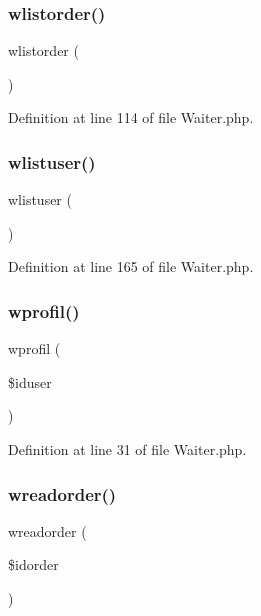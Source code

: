 \subsubsection{\texorpdfstring{wlistorder()}{wlistorder()}}
{\footnotesize\ttfamily wlistorder (\begin{DoxyParamCaption}{ }\end{DoxyParamCaption})}



Definition at line 114 of file Waiter.\+php.

\mbox{\label{class_waiter_a518c0e69e15f8e08ddff08921a621ed5}} 
\subsubsection{\texorpdfstring{wlistuser()}{wlistuser()}}
{\footnotesize\ttfamily wlistuser (\begin{DoxyParamCaption}{ }\end{DoxyParamCaption})}



Definition at line 165 of file Waiter.\+php.

\mbox{\label{class_waiter_ad785691c3d8df8e07e3b5c05e1fbb2ec}} 
\subsubsection{\texorpdfstring{wprofil()}{wprofil()}}
{\footnotesize\ttfamily wprofil (\begin{DoxyParamCaption}\item[{}]{\$iduser }\end{DoxyParamCaption})}



Definition at line 31 of file Waiter.\+php.

\mbox{\label{class_waiter_a485d8eef6a95cc2d0f48450fe27ec8f9}} 
\subsubsection{\texorpdfstring{wreadorder()}{wreadorder()}}
{\footnotesize\ttfamily wreadorder (\begin{DoxyParamCaption}\item[{}]{\$idorder }\end{DoxyParamCaption})}



